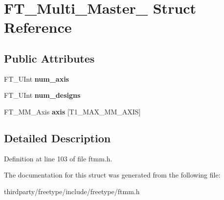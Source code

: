 \hypertarget{struct_f_t___multi___master__}{}\section{F\+T\+\_\+\+Multi\+\_\+\+Master\+\_\+ Struct Reference}
\label{struct_f_t___multi___master__}
\subsection*{Public Attributes}
\begin{DoxyCompactItemize}
\item 
\mbox{\label{struct_f_t___multi___master___a90a0ace4e40b91912259ad52fc86fb6f}} 
F\+T\+\_\+\+U\+Int {\bfseries num\+\_\+axis}
\item 
\mbox{\label{struct_f_t___multi___master___a78b797ee560f4b00795a7dce9656178d}} 
F\+T\+\_\+\+U\+Int {\bfseries num\+\_\+designs}
\item 
\mbox{\label{struct_f_t___multi___master___a1eb062ff3b5ac245ab9421a46b349818}} 
F\+T\+\_\+\+M\+M\+\_\+\+Axis {\bfseries axis} \mbox{[}T1\+\_\+\+M\+A\+X\+\_\+\+M\+M\+\_\+\+A\+X\+IS\mbox{]}
\end{DoxyCompactItemize}


\subsection{Detailed Description}


Definition at line 103 of file ftmm.\+h.



The documentation for this struct was generated from the following file\+:\begin{DoxyCompactItemize}
\item 
thirdparty/freetype/include/freetype/ftmm.\+h\end{DoxyCompactItemize}
